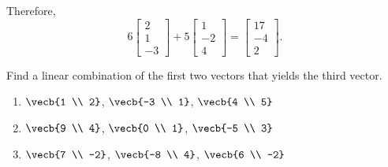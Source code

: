 \begin{Worked}
\begin{Solution}
Therefore,
$$
6 \begin{bmatrix} 2 \\ 1 \\ -3 \end{bmatrix}
+
5 \begin{bmatrix} 1 \\ -2 \\ 4 \end{bmatrix}
=
\begin{bmatrix} 17 \\ -4 \\ 2 \end{bmatrix}.
$$
\end{Solution}
\end{Worked}

\begin{Exercise}[title = {Linear Combinations}, label = combo]
Find a linear combination of the first two vectors that yields the third 
vector. 
\begin{enumerate}
\item $\vecb{1 \\ 2}$, $\vecb{-3 \\ 1}$, $\vecb{4 \\ 5}$
\item $\vecb{9 \\ 4}$, $\vecb{0 \\ 1}$, $\vecb{-5 \\ 3}$
\item $\vecb{7 \\ -2}$, $\vecb{-8 \\ 4}$, $\vecb{6 \\ -2}$
\end{enumerate}
\end{Exercise}

